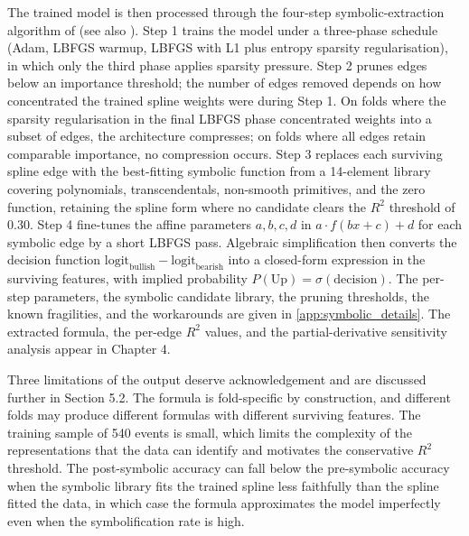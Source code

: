 The trained model is then processed through the four-step symbolic-extraction algorithm of \citet{cho_lee_kim_2025} (see also \citet{noorizadegan_2026}). Step 1 trains the model under a three-phase schedule (Adam, LBFGS warmup, LBFGS with L1 plus entropy sparsity regularisation), in which only the third phase applies sparsity pressure. Step 2 prunes edges below an importance threshold; the number of edges removed depends on how concentrated the trained spline weights were during Step 1. On folds where the sparsity regularisation in the final LBFGS phase concentrated weights into a subset of edges, the architecture compresses; on folds where all edges retain comparable importance, no compression occurs. Step 3 replaces each surviving spline edge with the best-fitting symbolic function from a 14-element library covering polynomials, transcendentals, non-smooth primitives, and the zero function, retaining the spline form where no candidate clears the $R^2$ threshold of 0.30. Step 4 fine-tunes the affine parameters $a, b, c, d$ in $a \cdot f(b x + c) + d$ for each symbolic edge by a short LBFGS pass. Algebraic simplification then converts the decision function $\text{logit}_{\text{bullish}} - \text{logit}_{\text{bearish}}$ into a closed-form expression in the surviving features, with implied probability $P(\text{Up}) = \sigma(\text{decision})$. The per-step parameters, the symbolic candidate library, the pruning thresholds, the known fragilities, and the workarounds are given in \label{ref:symbolic_appendix_call}\autoref{app:symbolic_details}. The extracted formula, the per-edge $R^2$ values, and the partial-derivative sensitivity analysis appear in Chapter 4.

Three limitations of the output deserve acknowledgement and are discussed further in Section 5.2. The formula is fold-specific by construction, and different folds may produce different formulas with different surviving features. The training sample of 540 events is small, which limits the complexity of the representations that the data can identify and motivates the conservative $R^2$ threshold. The post-symbolic accuracy can fall below the pre-symbolic accuracy when the symbolic library fits the trained spline less faithfully than the spline fitted the data, in which case the formula approximates the model imperfectly even when the symbolification rate is high.